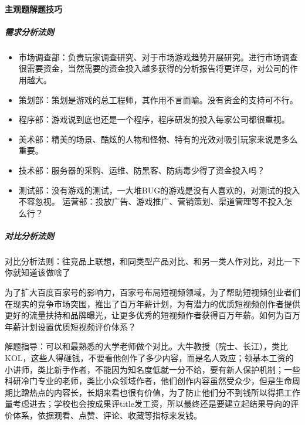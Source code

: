 \documentclass[letterpaper,11pt,english]{sphinxmanual}
\begin{document}
\paragraph{主观题解题技巧}
\label{\detokenize{chapter_interview/exam:id9}}

\subparagraph{需求分析法则}
\label{\detokenize{chapter_interview/exam:id10}}\begin{itemize}
\item {} 
市场调查部：负责玩家调查研究、对于市场游戏趋势开展研究。进行市场调查很需要资金，当然需要的资金投入越多获得的分析报告将更详尽，对公司的作用越大。

\item {} 
策划部：策划是游戏的总工程师，其作用不言而喻。没有资金的支持可不行。

\item {} 
程序部：游戏说到底也还是一个程序，程序研发的投入每家公司都很重视。

\item {} 
美术部：精美的场景、酷炫的人物和怪物、特有的光效对吸引玩家来说是多么重要。

\item {} 
技术部：服务器的采购、运维、防黑客、防病毒少得了资金投入吗？

\item {} 
测试部：没有游戏的测试，一大堆BUG的游戏是没有人喜欢的，对测试的投入不容忽视。
运营部：投放广告、游戏推广、营销策划、渠道管理等不投入怎么行？

\end{itemize}


\subparagraph{对比分析法则}
\label{\detokenize{chapter_interview/exam:id11}}
对比分析法则：往竞品上联想，和同类型产品对比、和另一类人作对比，对比一下你就知道该做啥了

为了扩大百度百家号的影响力，百家号布局短视频领域，为了帮助短视频创业者们在现实的竞争市场突围，推出了百万年薪计划，为有潜力的优质短视频创作者提供更好的流量扶持和品牌曝光，让更多优秀的短视频作者获得百万年薪。如何为百万年薪计划设置优质短视频评价体系？

解题指导：可以和最熟悉的大学老师做个对比。大牛教授（院士、长江），类比KOL，这些人得砸钱，不要看他创作了多少内容，而是名人效应；领基本工资的小讲师，类比新手作者，不能因为知名度低就一分不给，要有新人保护机制；一些科研冷门专业的老师，类比小众领域作者，他们创作内容虽然受众少，但是生命周期比蹭热点的内容长，长期来看也很有价值，为了防止他们分不到钱所以得把工作量考虑进去；学校也会按成果评title发工资，所以最终还是要建立起结果导向的评价体系，依据观看、点赞、评论、收藏等指标来发钱。
\end{document}
